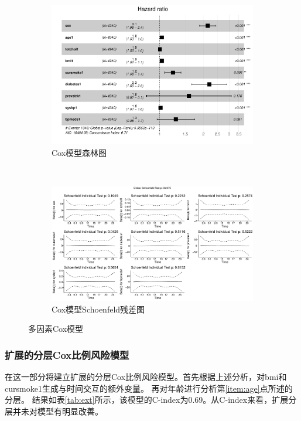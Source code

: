 \documentclass[lang=cn,11pt,a4paper,cite=super,AutoFakeBold]{elegantpaper}
\begin{document}
\begin{figure}[hbtp]
   \begin{subfigure}[b]{0.99\textwidth}
     \centering
     \includegraphics[width=\linewidth]{img/mulcox-1.pdf}  
   \caption{Cox模型森林图}
   \label{fig:mulcox1}
   \end{subfigure}
   ~
   \begin{center}
   \begin{subfigure}[b]{0.99\textwidth}
     \centering
     \includegraphics[width=\linewidth]{img/sr.pdf}  
     \caption{Cox模型Schoenfeld残差图}
     \label{fig:mulcox2}
   \end{subfigure} 
  \end{center}
   \caption{多因素Cox模型}
\end{figure}

\subsubsection{扩展的分层Cox比例风险模型}
在这一部分将建立扩展的分层Cox比例风险模型。首先根据上述分析，对bmi和cursmoke1生成与时间交互的额外变量。
再对年龄进行分析第\ref{item:age}点所述的分层。
结果如表\ref{tab:ext}所示，该模型的C-index为0.69。从C-index来看，扩展分层并未对模型有明显改善。
\end{document}
